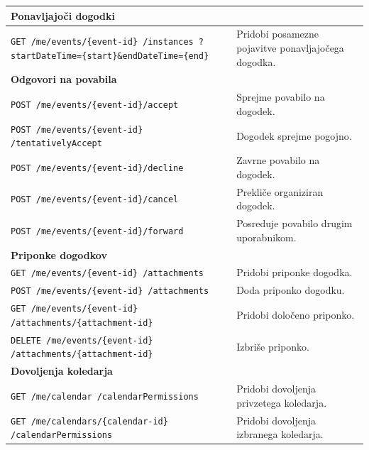 \documentclass[a4paper, 12pt]{book}
\begin{document}
\begin{longtable}{|p{7cm}|p{7.5cm}|}
\multicolumn{2}{|l|}{\textbf{Ponavljajoči dogodki}} \\
\hline

\texttt{GET /me/events/\{event-id\}
/instances
?startDateTime=\{start\}\&endDateTime=\{end\}} &
Pridobi posamezne pojavitve ponavljajočega dogodka. \\
\hline

\multicolumn{2}{|l|}{\textbf{Odgovori na povabila}} \\
\hline

\texttt{POST /me/events/\{event-id\}/accept} &
Sprejme povabilo na dogodek. \\
\hline

\texttt{POST /me/events/\{event-id\}
/tentativelyAccept} &
Dogodek sprejme pogojno. \\
\hline

\texttt{POST /me/events/\{event-id\}/decline} &
Zavrne povabilo na dogodek. \\
\hline

\texttt{POST /me/events/\{event-id\}/cancel} &
Prekliče organiziran dogodek. \\
\hline

\texttt{POST /me/events/\{event-id\}/forward} &
Posreduje povabilo drugim uporabnikom. \\
\hline

\multicolumn{2}{|l|}{\textbf{Priponke dogodkov}} \\
\hline

\texttt{GET /me/events/\{event-id\}
/attachments} &
Pridobi priponke dogodka. \\
\hline

\texttt{POST /me/events/\{event-id\}
/attachments} &
Doda priponko dogodku. \\
\hline

\texttt{GET /me/events/\{event-id\}
/attachments/\{attachment-id\}} &
Pridobi določeno priponko. \\
\hline

\texttt{DELETE /me/events/\{event-id\}
/attachments/\{attachment-id\}} &
Izbriše priponko. \\
\hline

\multicolumn{2}{|l|}{\textbf{Dovoljenja koledarja}} \\
\hline

\texttt{GET /me/calendar
/calendarPermissions} &
Pridobi dovoljenja privzetega koledarja. \\
\hline

\texttt{GET /me/calendars/\{calendar-id\}
/calendarPermissions} &
Pridobi dovoljenja izbranega koledarja. \\
\hline


\end{longtable}
\end{document}
